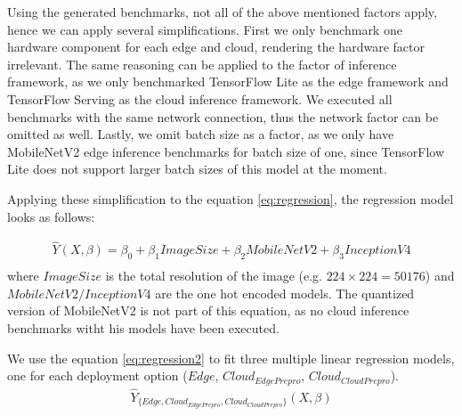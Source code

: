 Using the generated benchmarks, not all of the above mentioned factors apply, hence we can apply several simplifications.
First we only benchmark one hardware component for each edge and cloud, rendering the hardware factor irrelevant.
The same reasoning can be applied to the factor of inference framework, as we only benchmarked TensorFlow Lite as the edge framework and TensorFlow Serving as the cloud inference framework.
We executed all benchmarks with the same network connection, thus the network factor can be omitted as well.
Lastly, we omit batch size as a factor, as we only have MobileNetV2 edge inference benchmarks for batch size of one, since TensorFlow Lite does not support larger batch sizes of this model at the moment.

Applying these simplification to the equation \ref{eq:regression}, the regression model looks as follows:

\begin{equation}\label{eq:regression2}
\begin{gathered}
\hat{Y}(X,\beta) = \beta_0 + \beta_1 ImageSize + \beta_2 MobileNetV2 + \beta_3 InceptionV4 \\
\end{gathered}
\end{equation}
where $ImageSize$ is the total resolution of the image (e.g. $224\times224=50176$) and $MobileNetV2/InceptionV4$ are the one hot encoded models. The quantized version of MobileNetV2 is not part of this equation, as no cloud inference benchmarks witht his models have been executed.


We use the equation \ref{eq:regression2} to fit three multiple linear regression models, one for each deployment option ($Edge$, $Cloud_{EdgePrepro}$, $Cloud_{Cloud Prepro}$).
\begin{equation*}
\begin{gathered}
\hat{Y}_{\{Edge, Cloud_{EdgePrepro}, Cloud_{CloudPrepro}\}}(X,\beta) \\
\end{gathered}
\end{equation*}

